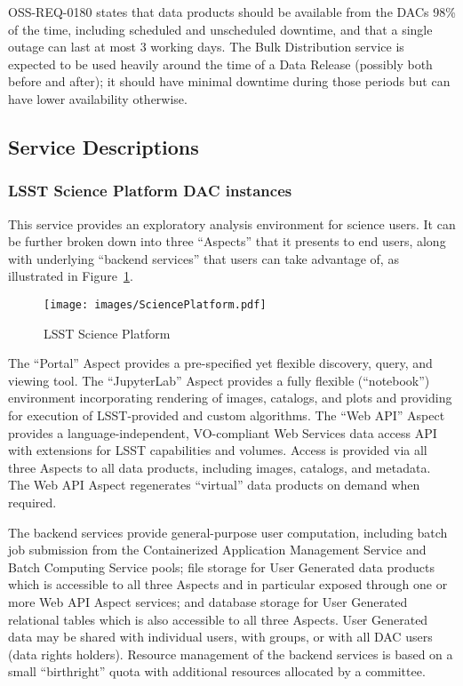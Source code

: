 \documentclass[DM,toc]{lsstdoc}
\begin{document}
OSS-REQ-0180 states that data products should be available from the DACs 98\% of the time, including scheduled and unscheduled downtime, and that a single outage can last at most 3 working days.
The Bulk Distribution service is expected to be used heavily around the time of a Data Release (possibly both before and after); it should have minimal downtime during those periods but can have lower availability otherwise.

\subsection{Service Descriptions}\label{dac-service-descriptions}

\subsubsection{LSST Science Platform DAC
instances}\label{lsst-science-platform-dac-instances}

This service provides an exploratory analysis environment for science
users. It can be further broken down into three ``Aspects'' that it
presents to end users, along with underlying ``backend services'' that
users can take advantage of, as illustrated in Figure~\ref{fig:lsp}.

\begin{figure}
\centering
\texttt{[image: images/SciencePlatform.pdf]}
\caption{LSST Science Platform}
\label{fig:lsp}
\end{figure}

The ``Portal'' Aspect provides a pre-specified yet flexible discovery,
query, and viewing tool. The ``JupyterLab'' Aspect provides a fully
flexible (``notebook'') environment incorporating rendering of images,
catalogs, and plots and providing for execution of LSST-provided and
custom algorithms. The ``Web API'' Aspect provides a
language-independent, VO-compliant Web Services data access API with
extensions for LSST capabilities and volumes. Access is provided via all
three Aspects to all data products, including images, catalogs, and
metadata. The Web API Aspect regenerates ``virtual'' data products on
demand when required.

The backend services provide general-purpose user computation, including
batch job submission from the Containerized Application Management Service and Batch Computing Service pools; file storage for User Generated data products which is accessible to all three Aspects and in particular exposed through one or more Web API Aspect services; and database storage for User Generated relational tables which is also accessible to all three Aspects.
User Generated data may be shared with
individual users, with groups, or with all DAC users (data rights
holders). Resource management of the backend services is based on a
small ``birthright'' quota with additional resources allocated by a
committee.
\end{document}
